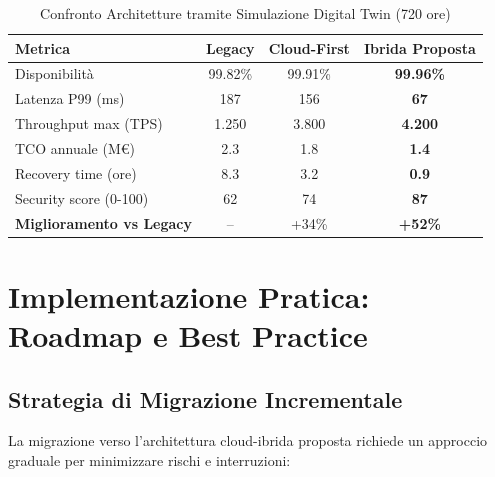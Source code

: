 \begin{table}[htbp]
\centering
\caption{Confronto Architetture tramite Simulazione Digital Twin (720 ore)}
\label{tab:architecture_comparison}
\begin{tabular}{lccc}
\toprule
\textbf{Metrica} & \textbf{Legacy} & \textbf{Cloud-First} & \textbf{Ibrida Proposta} \\
\midrule
Disponibilità & 99.82\% & 99.91\% & \textbf{99.96\%} \\
Latenza P99 (ms) & 187 & 156 & \textbf{67} \\
Throughput max (TPS) & 1.250 & 3.800 & \textbf{4.200} \\
TCO annuale (M€) & 2.3 & 1.8 & \textbf{1.4} \\
Recovery time (ore) & 8.3 & 3.2 & \textbf{0.9} \\
Security score (0-100) & 62 & 74 & \textbf{87} \\
\midrule
\textbf{Miglioramento vs Legacy} & -- & +34\% & \textbf{+52\%} \\
\bottomrule
\end{tabular}
\end{table}

\section{\texorpdfstring{Implementazione Pratica: Roadmap e Best Practice}{3.5 - Implementazione Pratica: Roadmap e Best Practice}}

\subsection{\texorpdfstring{Strategia di Migrazione Incrementale}{3.5.1 - Strategia di Migrazione Incrementale}}

La migrazione verso l'architettura cloud-ibrida proposta richiede un approccio graduale per minimizzare rischi e interruzioni:

